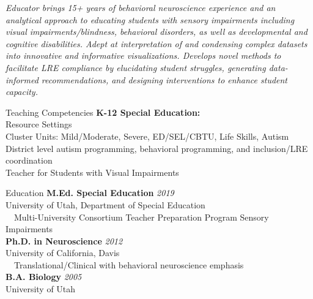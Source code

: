 \documentclass{resume} %
\begin{document}
\textit{Educator brings 15+ years of behavioral neuroscience experience and an analytical approach to educating students with sensory impairments including visual impairments/blindness, behavioral disorders, as well as developmental and cognitive disabilities. Adept at interpretation of and condensing complex datasets into innovative and informative visualizations. Develops novel methods to facilitate LRE compliance by elucidating student struggles, generating data-informed recommendations, and designing interventions to enhance student capacity.}

\begin{rSection}{Teaching Competencies}
    {\bf K-12 Special Education:} \\
    Resource Settings \\
    Cluster Units: Mild/Moderate, Severe, ED/SEL/CBTU, Life Skills, Autism \\
    District level autism programming, behavioral programming, and inclusion/LRE coordination \\
    Teacher for Students with Visual Impairments
\end{rSection}
\begin{rSection}{Education}
    {\bf M.Ed. Special Education}
    \hfill {\em2019} \\ 
	University of Utah, Department of Special Education\\
	\textbullet~~Multi-University Consortium Teacher Preparation Program Sensory Impairments
	\\ {\bf Ph.D. in Neuroscience} \hfill {\em 2012}\\
	University of California, Davis\\
	\textbullet~~Translational/Clinical with behavioral neuroscience emphasis\\
	{\bf B.A. Biology} \hfill {\em 2005}\\ 
	University of Utah
\end{rSection}
\end{document}
